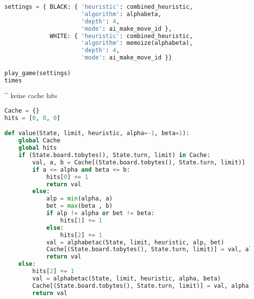 \begin{lstlisting}[language=Python]
settings = { BLACK: { 'heuristic': combined_heuristic,
                      'algorithm': alphabeta,
                      'depth': 4,
                      'mode': ai_make_move_id },
             WHITE: { 'heuristic': combined_heuristic,
                      'algorithm': memoize(alphabeta),
                      'depth': 4,
                      'mode': ai_make_move_id }}

play_game(settings)
times
\end{lstlisting}

\^{} keine cache hits

\begin{lstlisting}[language=Python]
Cache = {}
hits = [0, 0, 0]

def value(State, limit, heuristic, alpha=-1, beta=1):
    global Cache
    global hits
    if (State.board.tobytes(), State.turn, limit) in Cache:
        val, a, b = Cache[(State.board.tobytes(), State.turn, limit)]
        if a <= alpha and beta <= b:
            hits[0] += 1
            return val
        else:
            alp = min(alpha, a)
            bet = max(beta , b)
            if alp != alpha or bet != beta:
                hits[1] += 1
            else:
                hits[2] += 1
            val = alphabetac(State, limit, heuristic, alp, bet)
            Cache[(State.board.tobytes(), State.turn, limit)] = val, alp, bet
            return val
    else:
        hits[2] += 1
        val = alphabetac(State, limit, heuristic, alpha, beta)
        Cache[(State.board.tobytes(), State.turn, limit)] = val, alpha, beta
        return val
\end{lstlisting}

